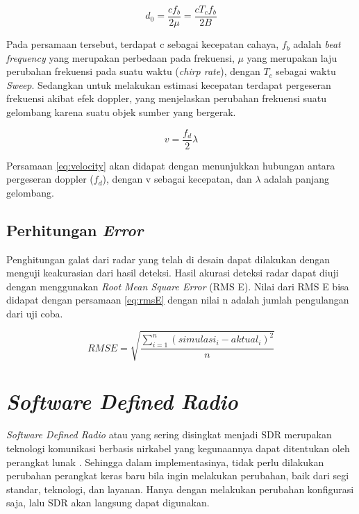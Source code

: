 \begin{equation}
	d_{0} = \frac{c f_{b}}{2 \mu} = \frac{c T_{c} f_{b}}{2 B}
	\label{eq:RangeEst}
\end{equation}

Pada persamaan tersebut, terdapat c sebagai kecepatan cahaya, $f_{b}$ adalah \textit{beat frequency} yang merupakan perbedaan pada frekuensi,  $\mu$ yang merupakan laju perubahan frekuensi pada suatu waktu (\textit{chirp rate}), dengan $T_{c}$ sebagai waktu \textit{Sweep}. Sedangkan untuk melakukan estimasi kecepatan terdapat pergeseran frekuensi akibat efek doppler, yang menjelaskan perubahan frekuensi suatu gelombang karena suatu objek sumber yang bergerak. 

\begin{equation}
	v = \frac{f_{d}}{2}\lambda
	\label{eq:velocity}
\end{equation}

Persamaan \ref{eq:velocity} akan didapat dengan menunjukkan hubungan antara pergeseran doppler ($f_{d}$), dengan v sebagai kecepatan, dan $\lambda$ adalah panjang gelombang. 

\subsection{Perhitungan \textit{Error}}
Penghitungan galat dari radar yang telah di desain dapat dilakukan dengan menguji keakurasian dari hasil deteksi. Hasil akurasi deteksi radar dapat diuji dengan menggunakan \textit{Root Mean Square Error} (RMS E). Nilai dari RMS E bisa didapat dengan persamaan \ref{eq:rmsE} dengan nilai n adalah jumlah pengulangan dari uji coba.

\begin{equation}
	RMS E = \sqrt{\frac{\sum_{i = 1}^{n} (simulasi_{i}-aktual_{i})^2}{n}}
	\label{eq:rmsE}
\end{equation}

\section{\textit{Software Defined Radio}}
\textit{Software Defined Radio} atau yang sering disingkat menjadi SDR merupakan teknologi komunikasi berbasis nirkabel yang kegunaannya dapat ditentukan oleh perangkat lunak \cite{Anisah2018}. Sehingga dalam implementasinya, tidak perlu dilakukan perubahan perangkat keras baru bila ingin melakukan perubahan, baik dari segi standar, teknologi, dan layanan. Hanya dengan melakukan perubahan konfigurasi saja, lalu SDR akan langsung dapat digunakan. 

